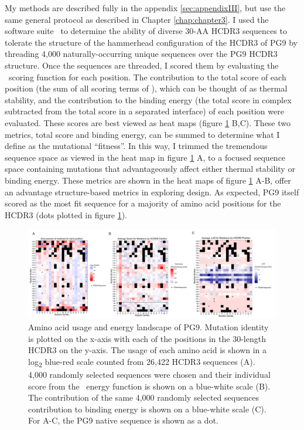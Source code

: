 My methods are described fully in the appendix \ref{sec:appendixIII}, but use the same general protocol as described in Chapter \ref{chap:chapter3}. I used the software suite \rosetta~to determine the ability of diverse 30-AA HCDR3 sequences to tolerate the structure of the hammerhead configuration of the HCDR3 of PG9 by threading 4,000 naturally-occurring unique sequences over the PG9 HCDR3 structure. Once the sequences are threaded, I scored them by evaluating the \rosetta~scoring function for each position. The contribution to the total score of each position (the sum of all scoring terms of \rosetta), which can be thought of as thermal stability, and the contribution to the binding energy (the total score in complex subtracted from the total score in a separated interface) of each position were evaluated. These scores are best viewed as heat maps (figure \ref{fig:figure4_2} B,C). These two metrics, total score and binding energy, can be summed to determine what I define as the mutational ``fitness''. In this way, I trimmed the tremendous sequence space as viewed in the heat map in figure \ref{fig:figure4_2} A, to a focused sequence space containing mutations that advantageously affect either thermal stability or binding energy. These metrics are shown in the heat maps of figure \ref{fig:figure4_2} A-B, offer an advantage structure-based metrics in exploring design. As expected, PG9 itself scored as the most fit sequence for a majority of amino acid positions for the HCDR3 (dots plotted in figure \ref{fig:figure4_2}).

\begin{figure}
   \centering
   \includegraphics[width=.99\textwidth]{images/chapter4/figure4_2.pdf} %
   \caption[Amino Acid Usage and Energy Landscape of PG9]{Amino acid usage and energy landscape of PG9. Mutation identity is plotted on the x-axis with each of the positions in the 30-length HCDR3 on the y-axis. The usage of each amino acid is shown in a log\textsubscript{2} blue-red scale counted from 26,422 HCDR3 sequences (A). 4,000 randomly selected sequences were chosen and their individual score from the \rosetta~energy function is shown on a blue-white scale (B). The contribution of the same 4,000 randomly selected sequences contribution to binding energy is shown on a blue-white scale (C). For A-C, the PG9 native sequence is shown as a dot.
}
   \label{fig:figure4_2}
\end{figure}

